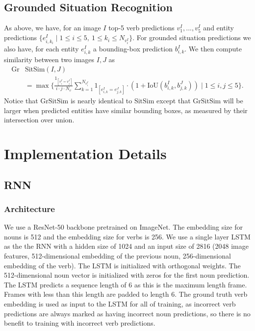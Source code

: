 \documentclass[runningheads]{llncs}
\begin{document}
\subsection{Grounded Situation Recognition}

As above, we have, for an image $I$ top-5 verb predictions $v^I_1,...,v^I_5$ and entity predictions $\{e^I_{i,k_i}\mid 1\leq i\leq 5,\ 1\leq k_i\leq N_{v^I_i}\}$. For grounded situation predictions we also have, for each entity $e^I_{i,k}$ a bounding-box prediction $b^I_{i, k}$. We then compute similarity between two images $I,J$ as 
\begin{align}
    \text{Gr}&\text{SitSim}(I, J) \nonumber \\
    &= \max\{\frac{1_{[v^I_i = v^J_j]}}{i\cdot j\cdot N_v}\sum_{k=1}^{N_{v^I_i}} 1_{[e^I_{i,k}=e^J_{j,k}]}\cdot (1 + \text{IoU}(b^I_{i,k}, b^J_{j,k})) \mid 1\leq i,j\leq 5\}.
\end{align}
Notice that $\text{GrSitSim}$ is nearly identical to $\text{SitSim}$ except that $\text{GrSitSim}$ will be larger when predicted entities have similar bounding boxes, as measured by their intersection over union.

 \section{Implementation Details}
\label{sec:imp}
\subsection{RNN}
\subsubsection{Architecture}
We use a ResNet-50 backbone pretrained on ImageNet. The embedding size for nouns is 512 and the embedding size for verbs is 256. We use a single layer LSTM as the the RNN with a hidden size of 1024 and an input size of 2816 (2048 image features, 512-dimensional embedding of the previous noun, 256-dimensional embedding of the verb). The LSTM is initialized with orthogonal weights. The 512-dimensional noun vector is initialized with zeros for the first noun prediction. The LSTM predicts a sequence length of 6 as this is the maximum length frame. Frames with less than this length are padded to length 6. The ground truth verb embedding is used as input to the LSTM for all of training, as incorrect verb predictions are always marked as having incorrect noun predictions, so there is no benefit to training with incorrect verb predictions. 
\end{document}
